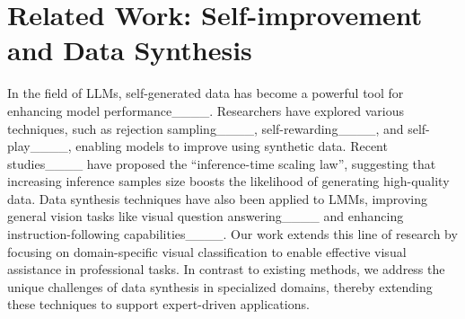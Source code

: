\section{Related Work: Self-improvement and Data Synthesis}
In the field of LLMs, self-generated data has become a powerful tool for enhancing model performance____. Researchers have explored various techniques, such as rejection sampling____, self-rewarding____, and self-play____, enabling models to improve using synthetic data. Recent studies____ have proposed the ``inference-time scaling law'', suggesting that increasing inference samples size boosts the likelihood of generating high-quality data.
Data synthesis techniques have also been applied to LMMs, improving general vision tasks like visual question answering____ and enhancing instruction-following capabilities____. Our work extends this line of research by focusing on domain-specific visual classification to enable effective visual assistance in professional tasks. In contrast to existing methods, we address the unique challenges of data synthesis in specialized domains, thereby extending these techniques to support expert-driven applications.